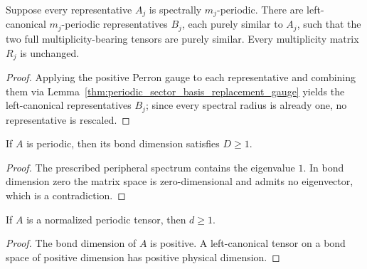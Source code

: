\begin{lemma}
    \label{thm:spectral_periodic_sector_normalization}
    \leanok
    Suppose every representative $A_j$ is spectrally $m_j$-periodic.  There
    are left-canonical $m_j$-periodic representatives $B_j$, each purely
    similar to $A_j$, such that the two full multiplicity-bearing tensors are
    purely similar.  Every multiplicity matrix $R_j$ is unchanged.
\end{lemma}
\begin{proof}
    \leanok
    Applying the positive Perron gauge to each representative and combining
    them via Lemma~\ref{thm:periodic_sector_basis_replacement_gauge} yields
    the left-canonical representatives $B_j$; since every spectral radius is
    already one, no representative is rescaled.
\end{proof}

\begin{lemma}
    \label{thm:periodic_bond_dimension_pos}
    \leanok
    If $A$ is periodic, then its bond dimension satisfies $D\geq1$.
\end{lemma}
\begin{proof}\leanok
    The prescribed peripheral spectrum contains the eigenvalue $1$. In bond
    dimension zero the matrix space is zero-dimensional and admits no
    eigenvector, which is a contradiction.
\end{proof}

\begin{lemma}
    \label{thm:periodic_physical_dimension_pos}
    \leanok
    If $A$ is a normalized periodic tensor, then $d\geq1$.
\end{lemma}
\begin{proof}\leanok
    The bond dimension of $A$ is positive. A left-canonical tensor on a
    bond space of positive dimension has positive physical dimension.
\end{proof}

